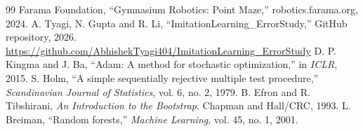 \documentclass[conference]{IEEEtran}
\begin{document}
\begin{thebibliography}{99}
 Farama Foundation, ``Gymnasium Robotics: Point Maze,'' robotics.farama.org, 2024.
 A. Tyagi, N. Gupta and R. Li, ``ImitationLearning\_ErrorStudy,'' GitHub repository, 2026. \url{https://github.com/AbhishekTyagi404/ImitationLearning_ErrorStudy}
 D. P. Kingma and J. Ba, ``Adam: A method for stochastic optimization,'' in \emph{ICLR}, 2015.
 S. Holm, ``A simple sequentially rejective multiple test procedure,'' \emph{Scandinavian Journal of Statistics}, vol. 6, no. 2, 1979.
 B. Efron and R. Tibshirani, \emph{An Introduction to the Bootstrap}. Chapman and Hall/CRC, 1993.
 L. Breiman, ``Random forests,'' \emph{Machine Learning}, vol. 45, no. 1, 2001.
\end{thebibliography}
\end{document}
